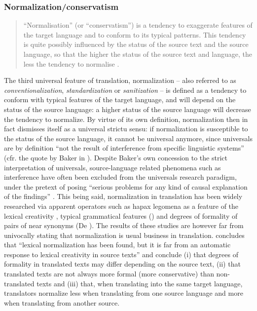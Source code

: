 \subsubsection{\label{sec:2.2.2.3}  Normalization/conservatism}
\begin{quote}
“Normalisation” (or “conservatism”) is a tendency to exaggerate features of the target language and to conform to its typical patterns. This tendency is quite possibly influenced by the status of the source text and the source language, so that the higher the status of the source text and language, the less the tendency to normalise  \citep[183]{Baker1996}.
\end{quote}


The third universal feature of translation, normalization – also referred to as \textit{conventionalization}, \textit{standardization} or \textit{sanitization} \citep[23]{zanettin_corpus_2013} – is defined as a tendency to conform with typical features of the target language, and will depend on the status of the source language: a higher status of the source language will decrease the tendency to normalize. By virtue of its own definition, normalization then in fact dismisses itself as a universal strictu sensu: if normalization is susceptible to the status of the source language, it cannot be universal anymore, since universals are by definition “not the result of interference from specific linguistic systems” (cfr. the quote by Baker in ). Despite Baker’s own concession to the strict interpretation of universals, source-language related phenomena such as interference have often been excluded from the universals research paradigm, under the pretext of posing “serious problems for any kind of causal explanation of the findings” \citep[311]{pym_tourys_2008}. This being said, normalization in translation has been widely researched via apparent operators such as hapax legomena as a feature of the lexical creativity \citep{kenny_lexis_2001}, typical grammatical features (\citealt{kranich_between_2011}) and degrees of formality of pairs of near synonyms (De \citealt{SutterEtAl2012}). The results of these studies are however far from univocally stating that normalization is usual business in translation. \citet[210]{kenny_lexis_2001} concludes that “lexical normalization has been found, but it is far from an automatic response to lexical creativity in source texts” and \citet[338]{oakes_lexical_2012} conclude (i) that degrees of formality in translated texts may differ depending on the source text, (ii) that translated texts are not always more formal (more conservative) than non-translated texts and (iii) that, when translating into the same target language, translators normalize less when translating from one source language and more when translating from another source.



